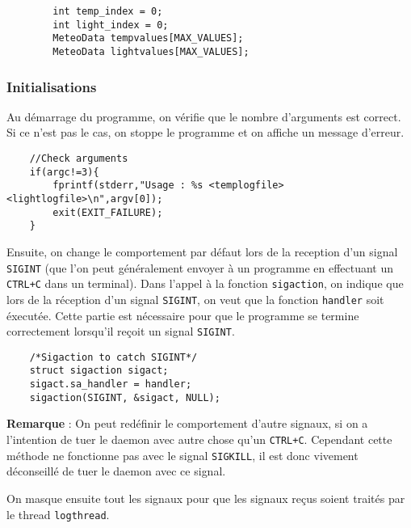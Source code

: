 \begin{DDbox}{\linewidth}
\begin{lstlisting}
        int temp_index = 0;
        int light_index = 0;
        MeteoData tempvalues[MAX_VALUES];
        MeteoData lightvalues[MAX_VALUES];
\end{lstlisting}
\end{DDbox}

\subsubsection{Initialisations}

Au démarrage du programme, on vérifie que le nombre d'arguments est correct. Si
ce n'est pas le cas, on stoppe le programme et on affiche un message d'erreur.
\\

\begin{DDbox}{\linewidth}
\begin{lstlisting}
	//Check arguments
	if(argc!=3){
		fprintf(stderr,"Usage : %s <templogfile> <lightlogfile>\n",argv[0]);
		exit(EXIT_FAILURE);
	}
\end{lstlisting}
\end{DDbox}

Ensuite, on change le comportement par défaut lors de la reception d'un signal
\texttt{SIGINT} (que l'on peut généralement envoyer à un programme en effectuant
un \texttt{CTRL+C} dans un terminal). Dans l'appel à la fonction
\texttt{sigaction}, on indique que lors de la réception d'un signal
\texttt{SIGINT}, on veut que la fonction \texttt{handler} soit éxecutée. Cette
partie est nécessaire pour que le programme se termine correctement lorsqu'il
reçoit un signal \texttt{SIGINT}.\\

\begin{DDbox}{\linewidth}
\begin{lstlisting}
	/*Sigaction to catch SIGINT*/
	struct sigaction sigact;
	sigact.sa_handler = handler;
	sigaction(SIGINT, &sigact, NULL);
\end{lstlisting}
\end{DDbox}

\textbf{Remarque} : On peut redéfinir le comportement d'autre signaux, si on a
l'intention de tuer le daemon avec autre chose qu'un \texttt{CTRL+C}. Cependant
cette méthode ne fonctionne pas avec le signal \texttt{SIGKILL}, il est donc
vivement déconseillé de tuer le daemon avec ce signal.

On masque ensuite tout les signaux pour que les signaux reçus soient traités par
le thread \texttt{logthread}. \\

